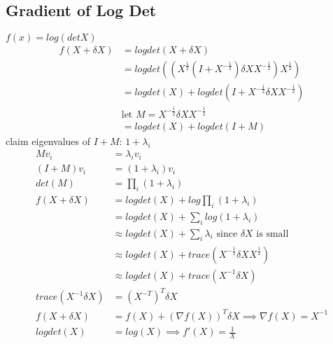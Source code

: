 \documentclass[8pt]{extarticle}
\begin{document}
\begin{multicols*}{2}
  \subsection{Gradient of Log Det}
  $f(x)=log(det X)$\\
  \begin{align*}
    f(X+\delta X) &= logdet(X+\delta X)\\
                  &= logdet((X^{\frac{1}{2}}(I+X^{-\frac{1}{2}}) \delta X X^{-\frac{1}{2}})X^{\frac{1}{2}})\\
                  &= logdet(X)+logdet(I+X^{-\frac{1}{2}} \delta X X^{-\frac{1}{2}})\\
                  & \text{let } M = X^{-\frac{1}{2}} \delta X X^{-\frac{1}{2}}\\
                  &= logdet(X)+logdet(I+M)
  \end{align*}
  claim eigenvalues of $I+M$: $1+\lambda_i$
  \begin{align*}
    Mv_i &= \lambda_i v_i\\
    (I+M)v_i &= (1+\lambda_i)v_i\\
    det(M)&=\prod_i(1+\lambda_i)\\
    f(X+\delta X) &= logdet(X) + log \prod_i(1+\lambda_i)\\
         &= logdet(X) + \sum_i log(1+\lambda_i)\\
         &\approx logdet(X) + \sum_i \lambda_i \text{ since } \delta X \text{ is small}\\
         &\approx logdet(X) + trace(X^{-\frac{1}{2}} \delta X X^{\frac{1}{2}})\\
         &\approx logdet(X) + trace(X^{-1} \delta X)\\
    trace(X^{-1} \delta X) &= (X^{-T})^T \delta X\\
    f(X+\delta X) &= f(X) + (\nabla f(X))^T \delta X \implies \nabla f(X) = X^{-1}\\
    logdet(X) &= log(X) \implies f'(X)=\frac{1}{X}
  \end{align*}
    

\end{multicols*}
\end{document}
